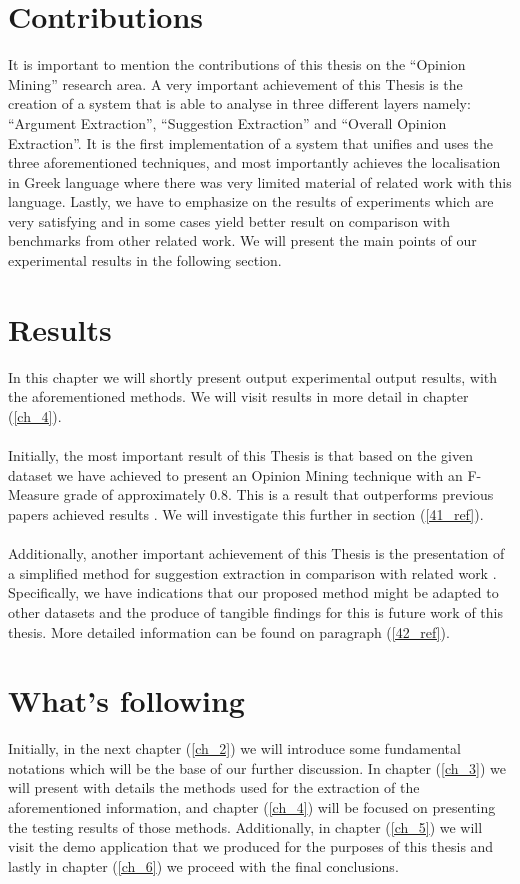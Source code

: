 \section{Contributions}
It is important to mention the contributions of this thesis on the ``Opinion Mining'' research area. A very important achievement of this Thesis is the creation of a system that is able to analyse in three different layers namely: ``Argument Extraction'', ``Suggestion Extraction'' and ``Overall Opinion Extraction''. It is the first implementation of a system that unifies and uses the three aforementioned techniques, and most importantly achieves the localisation in Greek language where there was very limited material of related work with this language. Lastly, we have to emphasize on the results of experiments which are very satisfying and in some cases yield better result on comparison with benchmarks from other related work. We will present the main points of our experimental results in the following section.

\section{Results}
In this chapter we will shortly present output experimental output results, with the aforementioned methods. We will visit results in more detail in chapter (\ref{ch_4}).\\
\\
Initially, the most important result of this Thesis is that based on the given dataset we have achieved to present an Opinion Mining technique with an F-Measure grade of approximately $0.8$. This is a result that outperforms previous papers achieved results \cite{5}. We will investigate this further in section (\ref{41_ref}).\\
\\
Additionally, another important achievement of this Thesis is the presentation of a simplified method for suggestion extraction in comparison with related work \cite{9}. Specifically, we have indications that our proposed method might be adapted to other datasets and the produce of tangible findings for this is future work of this thesis. More detailed information can be found on paragraph (\ref{42_ref}).


\section{What’s following}
Initially, in the next chapter (\ref{ch_2}) we will introduce some fundamental notations which will be the base of our further discussion. In chapter (\ref{ch_3}) we will present with details the methods used for the extraction of the aforementioned information, and chapter (\ref{ch_4}) will be focused on presenting the testing results of those methods. Additionally, in chapter (\ref{ch_5}) we will visit the demo application that we produced for the purposes of this thesis and lastly in chapter (\ref{ch_6}) we proceed with the final conclusions.